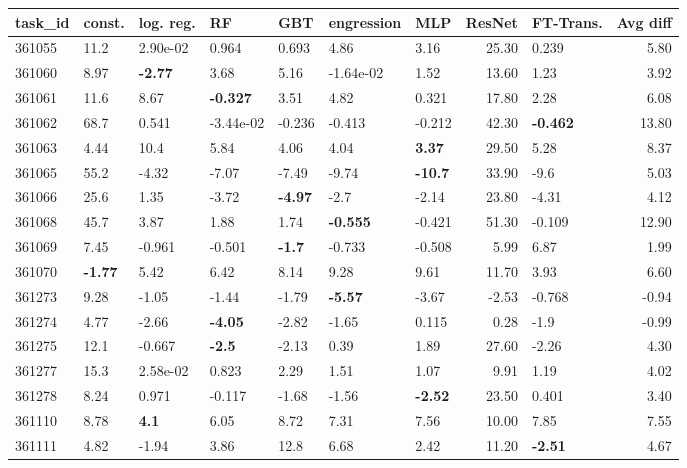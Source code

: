 \begin{table}[ht!]
\centering
\begingroup\footnotesize
\begin{tabular}{lllllllrlr}
  \hline
\hline
task\_id & const. & log. reg. & RF & GBT & engression & MLP & ResNet & FT-Trans. & Avg diff \\ 
  \hline
361055 & 11.2 &  2.90e-02 & 0.964 & 0.693 & 4.86 & 3.16 & 25.30 & 0.239 & 5.80 \\ 
  361060 & 8.97 & \textbf{-2.77} & 3.68 & 5.16 & -1.64e-02 & 1.52 & 13.60 & 1.23 & 3.92 \\ 
  361061 & 11.6 & 8.67 & \textbf{-0.327} & 3.51 & 4.82 & 0.321 & 17.80 & 2.28 & 6.08 \\ 
  361062 & 68.7 & 0.541 & -3.44e-02 & -0.236 & -0.413 & -0.212 & 42.30 & \textbf{-0.462} & 13.80 \\ 
  361063 & 4.44 & 10.4 & 5.84 & 4.06 & 4.04 & \textbf{3.37} & 29.50 & 5.28 & 8.37 \\ 
  361065 & 55.2 & -4.32 & -7.07 & -7.49 & -9.74 & \textbf{-10.7} & 33.90 & -9.6 & 5.03 \\ 
  361066 & 25.6 & 1.35 & -3.72 & \textbf{-4.97} & -2.7 & -2.14 & 23.80 & -4.31 & 4.12 \\ 
  361068 & 45.7 & 3.87 & 1.88 & 1.74 & \textbf{-0.555} & -0.421 & 51.30 & -0.109 & 12.90 \\ 
  361069 & 7.45 & -0.961 & -0.501 & \textbf{-1.7} & -0.733 & -0.508 & 5.99 & 6.87 & 1.99 \\ 
  361070 & \textbf{-1.77} & 5.42 & 6.42 & 8.14 & 9.28 & 9.61 & 11.70 & 3.93 & 6.60 \\ 
  361273 & 9.28 & -1.05 & -1.44 & -1.79 & \textbf{-5.57} & -3.67 & -2.53 & -0.768 & -0.94 \\ 
  361274 & 4.77 & -2.66 & \textbf{-4.05} & -2.82 & -1.65 & 0.115 & 0.28 & -1.9 & -0.99 \\ 
  361275 & 12.1 & -0.667 & \textbf{-2.5} & -2.13 & 0.39 & 1.89 & 27.60 & -2.26 & 4.30 \\ 
  361277 & 15.3 &  2.58e-02 & 0.823 & 2.29 & 1.51 & 1.07 & 9.91 & 1.19 & 4.02 \\ 
  361278 & 8.24 & 0.971 & -0.117 & -1.68 & -1.56 & \textbf{-2.52} & 23.50 & 0.401 & 3.40 \\ 
  361110 & 8.78 & \textbf{4.1} & 6.05 & 8.72 & 7.31 & 7.56 & 10.00 & 7.85 & 7.55 \\ 
  361111 & 4.82 & -1.94 & 3.86 & 12.8 & 6.68 & 2.42 & 11.20 & \textbf{-2.51} & 4.67 \\ 

\end{tabular}
\end{table}
